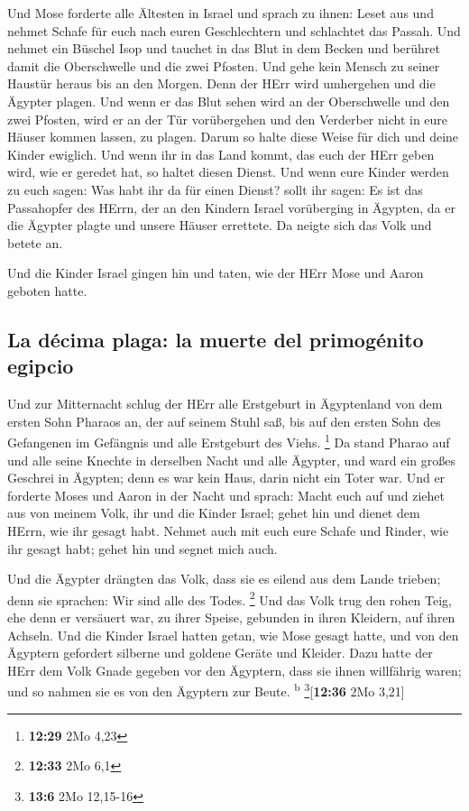  Und Mose forderte alle Ältesten in Israel und sprach zu
ihnen: Leset aus und nehmet Schafe für euch nach euren Geschlechtern und
schlachtet das Passah.  Und nehmet ein Büschel Isop und
tauchet in das Blut in dem Becken und berühret damit die Oberschwelle
und die zwei Pfosten. Und gehe kein Mensch zu seiner Haustür heraus bis
an den Morgen.  Denn der HErr wird umhergehen und die
Ägypter plagen. Und wenn er das Blut sehen wird an der Oberschwelle und
den zwei Pfosten, wird er an der Tür vorübergehen und den Verderber
nicht in eure Häuser kommen lassen, zu plagen.  Darum so
halte diese Weise für dich und deine Kinder ewiglich. 
Und wenn ihr in das Land kommt, das euch der HErr geben wird, wie er
geredet hat, so haltet diesen Dienst.  Und wenn eure
Kinder werden zu euch sagen: Was habt ihr da für einen Dienst?
 sollt ihr sagen: Es ist das Passahopfer des HErrn, der
an den Kindern Israel vorüberging in Ägypten, da er die Ägypter plagte
und unsere Häuser errettete. Da neigte sich das Volk und betete an.

 Und die Kinder Israel gingen hin und taten, wie der HErr
Mose und Aaron geboten hatte.

\hypertarget{la-duxe9cima-plaga-la-muerte-del-primoguxe9nito-egipcio}{%
\subsection{La décima plaga: la muerte del primogénito
egipcio}\label{la-duxe9cima-plaga-la-muerte-del-primoguxe9nito-egipcio}}

 Und zur Mitternacht schlug der HErr alle Erstgeburt in
Ägyptenland von dem ersten Sohn Pharaos an, der auf seinem Stuhl saß,
bis auf den ersten Sohn des Gefangenen im Gefängnis und alle Erstgeburt
des Viehs. \footnote{\textbf{12:29} 2Mo 4,23}  Da stand
Pharao auf und alle seine Knechte in derselben Nacht und alle Ägypter,
und ward ein großes Geschrei in Ägypten; denn es war kein Haus, darin
nicht ein Toter war.  Und er forderte Moses und Aaron in
der Nacht und sprach: Macht euch auf und ziehet aus von meinem Volk, ihr
und die Kinder Israel; gehet hin und dienet dem HErrn, wie ihr gesagt
habt.  Nehmet auch mit euch eure Schafe und Rinder, wie
ihr gesagt habt; gehet hin und segnet mich auch.

 Und die Ägypter drängten das Volk, dass sie es eilend
aus dem Lande trieben; denn sie sprachen: Wir sind alle des Todes.
\footnote{\textbf{12:33} 2Mo 6,1}  Und das Volk trug den
rohen Teig, ehe denn er versäuert war, zu ihrer Speise, gebunden in
ihren Kleidern, auf ihren Achseln.  Und die Kinder Israel
hatten getan, wie Mose gesagt hatte, und von den Ägyptern gefordert
silberne und goldene Geräte und Kleider.  Dazu hatte der
HErr dem Volk Gnade gegeben vor den Ägyptern, dass sie ihnen willfährig
waren; und so nahmen sie es von den Ägyptern zur Beute.
\textsuperscript{b} \footnote{\textbf{13:6} 2Mo 12,15-16}{[}\textbf{12:36}
2Mo 3,21{]}

